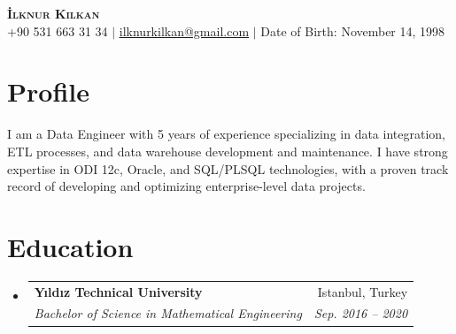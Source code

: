 \documentclass[letterpaper,11pt]{article}
\makeatletter
\newcommand{\resumeSubheading}[4]{
  \vspace{-2pt}\item
    \begin{tabular*}{0.97\textwidth}[t]{l@{\extracolsep{\fill}}r}
      \textbf{#1} & #2 \\
      \textit{\small#3} & \textit{\small #4} \\
    \end{tabular*}\vspace{-7pt}
}
\newcommand{\resumeSubHeadingListStart}{\begin{itemize}[leftmargin=0.15in, label={}]}
\newcommand{\resumeSubHeadingListEnd}{\end{itemize}}
\makeatother
\begin{document}
\begin{center}
    \textbf{\Huge \scshape İlknur Kılkan} \\ \vspace{1pt}
    \small +90 531 663 31 34 $|$ \href{mailto:ilknurkilkan@gmail.com}{\underline{ilknurkilkan@gmail.com}} $|$ 
    Date of Birth: November 14, 1998
\end{center}


\section{Profile}
 \begin{itemize}[leftmargin=0.15in, label={}]
    {\item{
     {I am a Data Engineer with 5 years of experience specializing in data integration, ETL processes, and data warehouse development and maintenance. 
     I have strong expertise in ODI 12c, Oracle, and SQL/PLSQL technologies, with a proven track record of developing and optimizing enterprise-level data projects.} \\
    }}
 \end{itemize}

\section{Education}
  \resumeSubHeadingListStart
    \resumeSubheading
      {Yıldız Technical University}{Istanbul, Turkey}
      {Bachelor of Science in Mathematical Engineering}{Sep. 2016 -- 2020}
  \resumeSubHeadingListEnd


\end{document}
